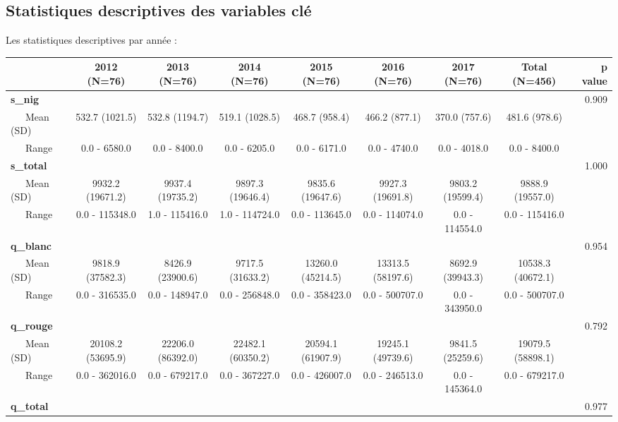 \documentclass[11pt, a4paper]{article}
\begin{document}
\subsection*{Statistiques descriptives des variables clé}
Les statistiques descriptives par année :
\begin{sidewaystable}
\begin{center}

\begin{tabular}{l|c|c|c|c|c|c|c|r}
\hline
 & 2012 (N=76) & 2013 (N=76) & 2014 (N=76) & 2015 (N=76) & 2016 (N=76) & 2017 (N=76) & Total (N=456) & p value\\
\hline
\textbf{s\_nig} &  &  &  &  &  &  &  & 0.909\\
\hline
~~~Mean (SD) & 532.7 (1021.5) & 532.8 (1194.7) & 519.1 (1028.5) & 468.7 (958.4) & 
466.2 (877.1) & 370.0 (757.6) & 481.6 (978.6) & \\
\hline
~~~Range & 0.0 - 6580.0 & 0.0 - 8400.0 & 0.0 - 6205.0 & 0.0 - 6171.0 & 0.0 - 4740.0 & 0.0 - 4018.0 & 0.0 - 8400.0 & \\
\hline
\textbf{s\_total} &  &  &  &  &  &  &  & 1.000\\
\hline
~~~Mean (SD) & 9932.2 (19671.2) & 9937.4 (19735.2) & 9897.3 (19646.4) & 9835.6 (19647.6) & 9927.3 (19691.8) & 9803.2 (19599.4) & 9888.9 (19557.0) & \\
\hline
~~~Range & 0.0 - 115348.0 & 1.0 - 115416.0 & 1.0 - 114724.0 & 0.0 - 113645.0 & 0.0 - 114074.0 & 0.0 - 114554.0 & 0.0 - 115416.0 & \\
\hline
\textbf{q\_blanc} &  &  &  &  &  &  &  & 0.954\\
\hline
~~~Mean (SD) & 9818.9 (37582.3) & 8426.9 (23900.6) & 9717.5 (31633.2) & 13260.0 (45214.5) & 13313.5 (58197.6) & 8692.9 (39943.3) & 10538.3 (40672.1) & \\
\hline
~~~Range & 0.0 - 316535.0 & 0.0 - 148947.0 & 0.0 - 256848.0 & 0.0 - 358423.0 & 0.0 - 500707.0 & 0.0 - 343950.0 & 0.0 - 500707.0 & \\
\hline
\textbf{q\_rouge} &  &  &  &  &  &  &  & 0.792\\
\hline
~~~Mean (SD) & 20108.2 (53695.9) & 22206.0 (86392.0) & 22482.1 (60350.2) & 20594.1 (61907.9) & 19245.1 (49739.6) & 9841.5 (25259.6) & 19079.5 (58898.1) & \\
\hline
~~~Range & 0.0 - 362016.0 & 0.0 - 679217.0 & 0.0 - 367227.0 & 0.0 - 426007.0 & 0.0 - 246513.0 & 0.0 - 145364.0 & 0.0 - 679217.0 & \\
\hline
\textbf{q\_total} &  &  &  &  &  &  &  & 0.977\\

\end{tabular}
\end{center}
\end{sidewaystable}
\end{document}
